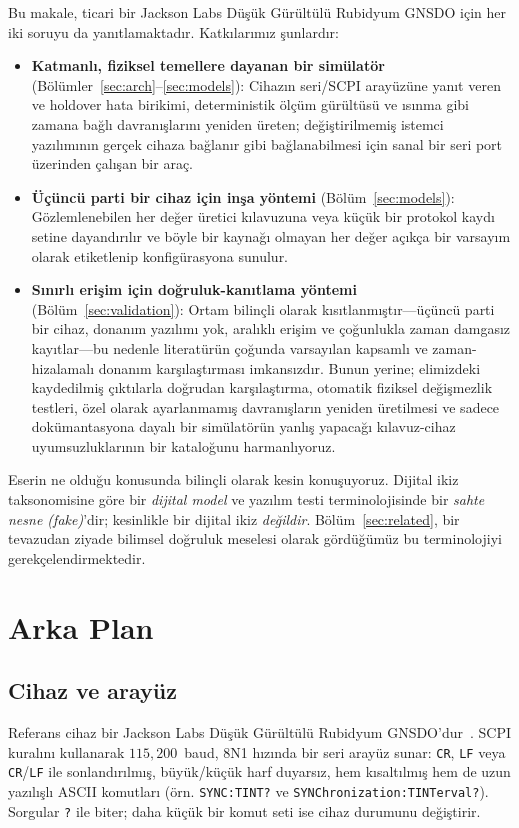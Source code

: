 \documentclass[conference]{IEEEtran}
\begin{document}
Bu makale, ticari bir Jackson Labs Düşük Gürültülü Rubidyum GNSDO için her iki soruyu da yanıtlamaktadır. Katkılarımız şunlardır:
\begin{itemize}
\item \textbf{Katmanlı, fiziksel temellere dayanan bir simülatör} (Bölümler~\ref{sec:arch}--\ref{sec:models}): Cihazın seri/SCPI arayüzüne yanıt veren ve holdover hata birikimi, deterministik ölçüm gürültüsü ve ısınma gibi zamana bağlı davranışlarını yeniden üreten; değiştirilmemiş istemci yazılımının gerçek cihaza bağlanır gibi bağlanabilmesi için sanal bir seri port üzerinden çalışan bir araç.
\item \textbf{Üçüncü parti bir cihaz için inşa yöntemi} (Bölüm~\ref{sec:models}): Gözlemlenebilen her değer üretici kılavuzuna veya küçük bir protokol kaydı setine dayandırılır ve böyle bir kaynağı olmayan her değer açıkça bir varsayım olarak etiketlenip konfigürasyona sunulur.
\item \textbf{Sınırlı erişim için doğruluk-kanıtlama yöntemi} (Bölüm~\ref{sec:validation}): Ortam bilinçli olarak kısıtlanmıştır---üçüncü parti bir cihaz, donanım yazılımı yok, aralıklı erişim ve çoğunlukla zaman damgasız kayıtlar---bu nedenle literatürün çoğunda varsayılan kapsamlı ve zaman-hizalamalı donanım karşılaştırması imkansızdır. Bunun yerine; elimizdeki kaydedilmiş çıktılarla doğrudan karşılaştırma, otomatik fiziksel değişmezlik testleri, özel olarak ayarlanmamış davranışların yeniden üretilmesi ve sadece dokümantasyona dayalı bir simülatörün yanlış yapacağı kılavuz-cihaz uyumsuzluklarının bir kataloğunu harmanlıyoruz.
\end{itemize}

Eserin ne olduğu konusunda bilinçli olarak kesin konuşuyoruz. Dijital ikiz taksonomisine göre bir \emph{dijital model} ve yazılım testi terminolojisinde bir \emph{sahte nesne (fake)}'dir; kesinlikle bir dijital ikiz \emph{değildir}. Bölüm~\ref{sec:related}, bir tevazudan ziyade bilimsel doğruluk meselesi olarak gördüğümüz bu terminolojiyi gerekçelendirmektedir.

\section{Arka Plan}
\label{sec:background}
\subsection{Cihaz ve arayüz}
Referans cihaz bir Jackson Labs Düşük Gürültülü Rubidyum GNSDO'dur~\cite{jacksonlabs2015lnrb}. SCPI kuralını kullanarak $115{,}200$~baud, 8N1 hızında bir seri arayüz sunar: \texttt{CR}, \texttt{LF} veya \texttt{CR}/\texttt{LF} ile sonlandırılmış, büyük/küçük harf duyarsız, hem kısaltılmış hem de uzun yazılışlı ASCII komutları (örn. \texttt{SYNC:TINT?} ve \texttt{SYNChronization:TINTerval?}). Sorgular \texttt{?} ile biter; daha küçük bir komut seti ise cihaz durumunu değiştirir.
\end{document}
